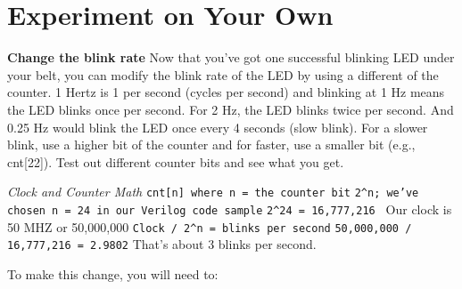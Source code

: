 \section*{Experiment on Your Own}
\begin{flushleft}

\textbf{Change the blink rate}
\newline
\newline
Now that you've got one successful blinking LED under your belt, you can modify the blink rate of the LED by using a different  of the counter. 1 Hertz is 1 per second (cycles per second) and blinking at 1 Hz means the LED blinks once per second. For 2 Hz, the LED blinks twice per second. And 0.25 Hz would blink the LED once every 4 seconds (slow blink). For a slower blink, use a higher bit of the counter and for faster, use a smaller bit (e.g., cnt[22]). Test out different counter bits and see what you get.

\newpage

\begin{adjustwidth}{2cm}{2cm}
\textit{Clock and Counter Math}
\newline
\newline
\texttt{cnt[n] where n = the counter bit}
\newline
\newline
\texttt{2\^{}n; we've chosen n = 24 in our Verilog code sample}
\newline
\texttt{2\^{}24 = 16,777,216 }
\newline
\newline
Our clock is 50 MHZ or 50,000,000
\newline
\newline
\texttt{Clock / 2\^{}n = blinks per second}
\newline
\texttt{50,000,000 / 16,777,216 = 2.9802}
\newline
\newline
That's about 3 blinks per second.
\newline
\end{adjustwidth}

To make this change, you will need to:

\begin{enumerate}[
	leftmargin=*,
	align=left]


\end{enumerate}
\end{flushleft}
